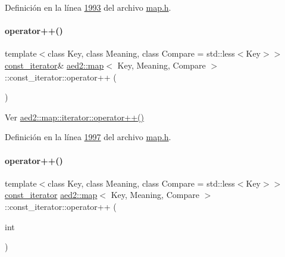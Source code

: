 Definición en la línea \hyperlink{map_8h_source_l01993}{1993} del archivo \hyperlink{map_8h_source}{map.\+h}.

\mbox{\label{classaed2_1_1map_1_1const__iterator_adaada1d489552555135d2ea89c67c271_adaada1d489552555135d2ea89c67c271}} 
\paragraph{\texorpdfstring{operator++()}{operator++()}\hspace{0.1cm}{\footnotesize\ttfamily [1/2]}}
{\footnotesize\ttfamily template$<$class Key, class Meaning, class Compare = std\+::less$<$\+Key$>$$>$ \\
\hyperlink{classaed2_1_1map_1_1const__iterator}{const\+\_\+iterator}\& \hyperlink{classaed2_1_1map}{aed2\+::map}$<$ Key, Meaning, Compare $>$\+::const\+\_\+iterator\+::operator++ (\begin{DoxyParamCaption}{ }\end{DoxyParamCaption})\hspace{0.3cm}{\ttfamily [inline]}}



Ver \hyperlink{classaed2_1_1map_1_1iterator_a7c44de7f0508186e135ddbcfe782fec5_a7c44de7f0508186e135ddbcfe782fec5}{aed2\+::map\+::iterator\+::operator++()} 



Definición en la línea \hyperlink{map_8h_source_l01997}{1997} del archivo \hyperlink{map_8h_source}{map.\+h}.

\mbox{\label{classaed2_1_1map_1_1const__iterator_a2fbc216b2f11694bb567ea850bcfdb2e_a2fbc216b2f11694bb567ea850bcfdb2e}} 
\paragraph{\texorpdfstring{operator++()}{operator++()}\hspace{0.1cm}{\footnotesize\ttfamily [2/2]}}
{\footnotesize\ttfamily template$<$class Key, class Meaning, class Compare = std\+::less$<$\+Key$>$$>$ \\
\hyperlink{classaed2_1_1map_1_1const__iterator}{const\+\_\+iterator} \hyperlink{classaed2_1_1map}{aed2\+::map}$<$ Key, Meaning, Compare $>$\+::const\+\_\+iterator\+::operator++ (\begin{DoxyParamCaption}\item[{int}]{ }\end{DoxyParamCaption})\hspace{0.3cm}{\ttfamily [inline]}}



